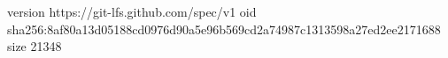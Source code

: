 version https://git-lfs.github.com/spec/v1
oid sha256:8af80a13d05188cd0976d90a5e96b569cd2a74987c1313598a27ed2ee2171688
size 21348

